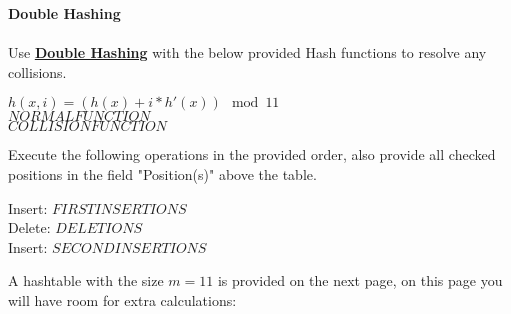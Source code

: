 \textbf{\LARGE{\color{tumgadRed} Double Hashing}}\\
\\
\noindent
Use \href{https://sebastianoner.github.io/TUMGAD/src/Algorithms/Hashing/Double/DoubleHashing}{\textbf{\underline{Double Hashing}}} with
the below provided Hash functions to resolve any collisions.
\begin{center}
    $h(x,i) = (h(x) + i* h'(x)) \mod 11$\\
    $NORMALFUNCTION$\\
    $COLLISIONFUNCTION$\\
\end{center}
Execute the following operations in the provided order, also provide all checked positions in the field "Position(s)" above the table.\\
\begin{center}
    Insert: $FIRSTINSERTIONS$\\
    Delete: $DELETIONS$\\
    Insert: $SECONDINSERTIONS$\\
\end{center}
A hashtable with the size $m = 11$ is provided on the next page, on this page you will have room for extra calculations:\\
\newline
\noindent{}
\newpage
